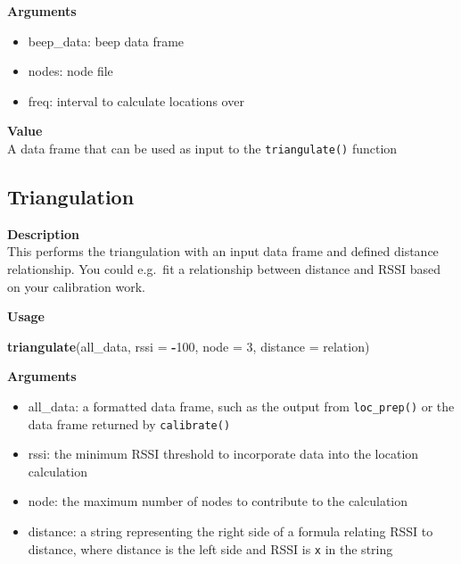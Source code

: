 \documentclass[
]{book}
\newenvironment{Shaded}{\begin{snugshade}}{\end{snugshade}}
\newcommand{\AttributeTok}[1]{\textcolor[rgb]{0.13,0.29,0.53}{#1}}
\newcommand{\DecValTok}[1]{\textcolor[rgb]{0.00,0.00,0.81}{#1}}
\newcommand{\FunctionTok}[1]{\textcolor[rgb]{0.13,0.29,0.53}{\textbf{#1}}}
\newcommand{\NormalTok}[1]{#1}
\newcommand{\SpecialCharTok}[1]{\textcolor[rgb]{0.81,0.36,0.00}{\textbf{#1}}}
\providecommand{\tightlist}{%
  \setlength{\itemsep}{0pt}\setlength{\parskip}{0pt}}
\begin{document}
\textbf{Arguments}

\begin{itemize}
\tightlist
\item
  beep\_data: beep data frame\\
\item
  nodes: node file\\
\item
  freq: interval to calculate locations over
\end{itemize}

\textbf{Value}\\
A data frame that can be used as input to the \texttt{triangulate()} function

\subsection{Triangulation}\label{triangulation}

\textbf{Description}\\
This performs the triangulation with an input data frame and defined distance relationship. You could e.g.~fit a relationship between distance and RSSI based on your calibration work.

\textbf{Usage}

\begin{Shaded}
\begin{Highlighting}[]
\FunctionTok{triangulate}\NormalTok{(all\_data, }\AttributeTok{rssi =} \SpecialCharTok{{-}}\DecValTok{100}\NormalTok{, }\AttributeTok{node =} \DecValTok{3}\NormalTok{, }\AttributeTok{distance =}\NormalTok{ relation)}
\end{Highlighting}
\end{Shaded}

\textbf{Arguments}

\begin{itemize}
\tightlist
\item
  all\_data: a formatted data frame, such as the output from \texttt{loc\_prep()} or the data frame returned by \texttt{calibrate()}\\
\item
  rssi: the minimum RSSI threshold to incorporate data into the location calculation\\
\item
  node: the maximum number of nodes to contribute to the calculation\\
\item
  distance: a string representing the right side of a formula relating RSSI to distance, where distance is the left side and RSSI is \texttt{x} in the string
\end{itemize}
\end{document}
